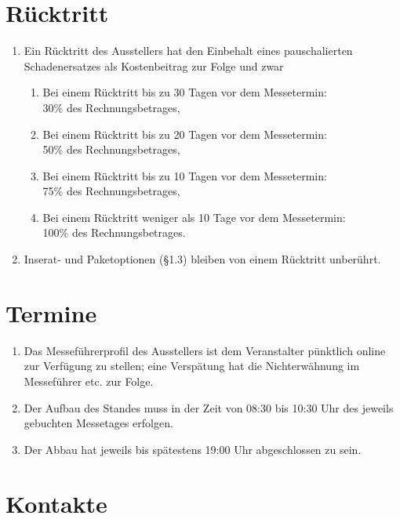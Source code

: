 \section{Rücktritt}
\begin{enumerate}
	\item Ein Rücktritt des Ausstellers hat den Einbehalt eines pauschalierten
		Schadenersatzes als Kostenbeitrag zur Folge und zwar
	\begin{enumerate}
		\item Bei einem Rücktritt bis zu 30 Tagen vor dem Messetermin:\\
			30\% des Rechnungsbetrages,
		\item Bei einem Rücktritt bis zu 20 Tagen vor dem Messetermin:\\
			50\% des Rechnungsbetrages,
		\item Bei einem Rücktritt bis zu 10 Tagen vor dem Messetermin:\\
			75\% des Rechnungsbetrages,
		\item Bei einem Rücktritt weniger als 10 Tage vor dem Messetermin:\\
			100\% des Rechnungsbetrages.
	\end{enumerate}

	\item Inserat- und Paketoptionen (\S 1.3) bleiben von einem Rücktritt unberührt.
\end{enumerate}

\section{Termine}

\begin{enumerate}
\item Das Messeführerprofil des Ausstellers ist dem Veranstalter pünktlich online zur Verfügung zu stellen; eine Verspätung hat die Nichterwähnung im Messeführer etc. zur Folge.
\item Der Aufbau des Standes muss in der Zeit von 08:30 bis 10:30 Uhr des jeweils gebuchten Messetages erfolgen.
\item Der Abbau hat jeweils bis spätestens 19:00 Uhr abgeschlossen zu sein.
\end{enumerate}

\section{Kontakte}

